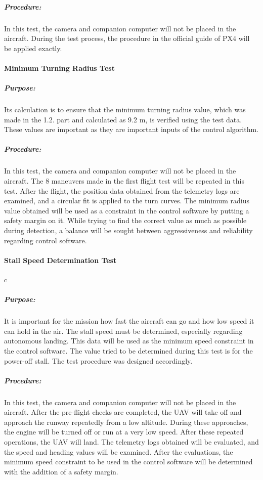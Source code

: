 \documentclass[12pt]{article}
\begin{document}
\subparagraph*{Procedure:}In this test, the camera and companion computer will not be placed in the aircraft. During the test process, the procedure in the official guide of PX4 will be applied exactly.

\paragraph{Minimum Turning Radius Test}

\subparagraph*{Purpose:} Its calculation is to ensure that the minimum turning radius value, which was made in the 1.2. part and calculated as 9.2 m, is verified using the test data. These values are important as they are important inputs of the control algorithm.

\subparagraph*{Procedure:} In this test, the camera and companion computer will not be placed in the aircraft. 
The 8 maneuvers made in the first flight test will be repeated in this test. After the flight, the position data obtained from the telemetry logs are examined, and a circular fit is applied to the turn curves. The minimum radius value obtained will be used as a constraint in the control software by putting a safety margin on it. While trying to find the correct value as much as possible during detection, a balance will be sought between aggressiveness and reliability regarding control software.

\paragraph{Stall Speed Determination Test}c

\subparagraph*{Purpose:} It is important for the mission how fast the aircraft can go and how low speed it can hold in the air. The stall speed must be determined, especially regarding autonomous landing. This data will be used as the minimum speed constraint in the control software.
The value tried to be determined during this test is for the power-off stall. The test procedure was designed accordingly.

\subparagraph*{Procedure:} In this test, the camera and companion computer will not be placed in the aircraft.
After the pre-flight checks are completed, the UAV will take off and approach the runway repeatedly from a low altitude. During these approaches, the engine will be turned off or run at a very low speed. After these repeated operations, the UAV will land. The telemetry logs obtained will be evaluated, and the speed and heading values will be examined. After the evaluations, the minimum speed constraint to be used in the control software will be determined with the addition of a safety margin.
\end{document}
